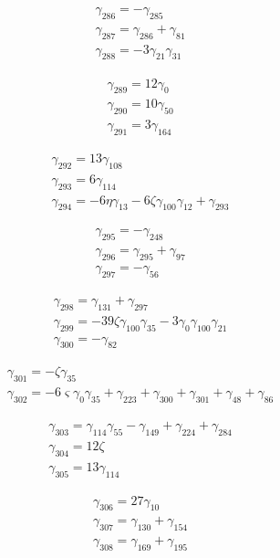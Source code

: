 \[\begin{aligned}\gamma_{286}=- \gamma_{285}\\ \gamma_{287}=\gamma_{286} + \gamma_{81}\\ \gamma_{288}=- 3 \gamma_{21} \gamma_{31}\end{aligned}\]

\[\begin{aligned}\gamma_{289}=12 \gamma_{0}\\ \gamma_{290}=10 \gamma_{50}\\ \gamma_{291}=3 \gamma_{164}\end{aligned}\]

\[\begin{aligned}\gamma_{292}=13 \gamma_{108}\\ \gamma_{293}=6 \gamma_{114}\\ \gamma_{294}=- 6 \eta  \gamma_{13} - 6 \zeta  \gamma_{100} \gamma_{12} + \gamma_{293}\end{aligned}\]

\[\begin{aligned}\gamma_{295}=- \gamma_{248}\\ \gamma_{296}=\gamma_{295} + \gamma_{97}\\ \gamma_{297}=- \gamma_{56}\end{aligned}\]

\[\begin{aligned}\gamma_{298}=\gamma_{131} + \gamma_{297}\\ \gamma_{299}=- 39 \zeta  \gamma_{100} \gamma_{35} - 3 \gamma_{0} \gamma_{100} \gamma_{21}\\ \gamma_{300}=- \gamma_{82}\end{aligned}\]

\[\begin{aligned}\gamma_{301}=- \zeta  \gamma_{35}\\ \gamma_{302}=- 6 \varsigma  \gamma_{0} \gamma_{35} + \gamma_{223} + \gamma_{300} + \gamma_{301} + \gamma_{48} + \gamma_{86}\end{aligned}\]

\[\begin{aligned}\gamma_{303}=\gamma_{114} \gamma_{55} - \gamma_{149} + \gamma_{224} + \gamma_{284}\\ \gamma_{304}=12 \zeta \\ \gamma_{305}=13 \gamma_{114}\end{aligned}\]

\[\begin{aligned}\gamma_{306}=27 \gamma_{10}\\ \gamma_{307}=\gamma_{130} + \gamma_{154}\\ \gamma_{308}=\gamma_{169} + \gamma_{195}\end{aligned}\]

